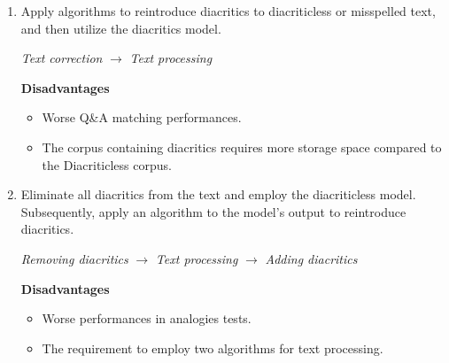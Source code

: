 \documentclass{article}
\begin{document}
\begin{enumerate}
  \item Apply algorithms to reintroduce diacritics to diacriticless or misspelled text, and then utilize the diacritics model. \newline
  \centerline{ \textit{Text correction} $\rightarrow$ \textit{Text processing} } \newline 
  \textbf{Disadvantages}
  \begin{itemize}
    \item Worse Q\&A matching performances.
    \item The corpus containing diacritics requires more storage space compared to the Diacriticless corpus.
  \end{itemize} 
  
  \item Eliminate all diacritics from the text and employ the diacriticless model. Subsequently, apply an algorithm to the model's output to reintroduce diacritics. \newline
  \centerline{ \textit{Removing diacritics} $\rightarrow$ \textit{Text processing} $\rightarrow$ \textit{Adding diacritics} } \newline
  \textbf{Disadvantages}
  \begin{itemize}
    \item Worse performances in analogies tests.
    \item The requirement to employ two algorithms for text processing.
  \end{itemize} 
\end{enumerate}




\nocite{fastText_website}
\end{document}
